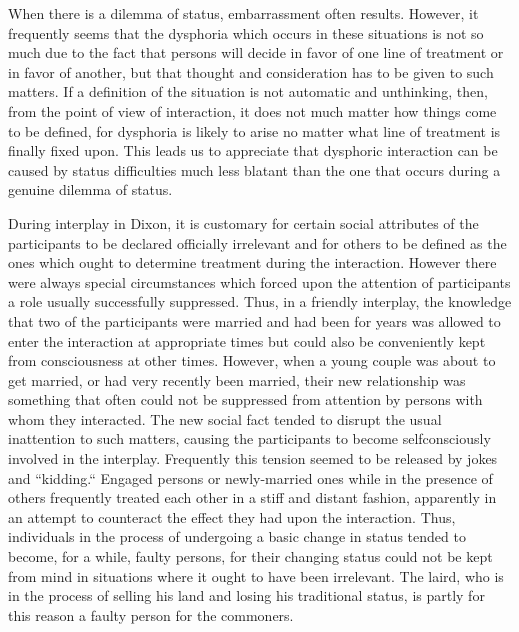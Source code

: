 \documentclass[openany,nobib]{tufte-book}
\begin{document}
When there is a dilemma of status, embarrassment often results. However,
it frequently seems that the dysphoria which occurs in these situations
is not so much due to the fact that persons will decide in favor of one
line of treatment or in favor of another, but that thought and
consideration has to be given to such matters. If a definition of the
situation is not automatic and unthinking, then, from the point of view
of interaction, it does not much matter how things come to be defined,
for dysphoria is likely to arise no matter what line of treatment is
finally fixed upon. This leads us to appreciate that dysphoric
interaction can be caused by status difficulties much less blatant than
the one that occurs during a genuine dilemma of status.

During interplay in Dixon, it is customary for certain social attributes
of the participants to be declared officially irrelevant and for others
to be defined as the ones which ought to determine treatment during the
interaction. However there were always special circumstances which
forced upon the attention of participants a role usually successfully
suppressed. Thus, in a friendly interplay, the knowledge that two of the
participants were married and had been for years was allowed to enter
the interaction at appropriate times but could also be conveniently kept
from consciousness at other times. However, when a young couple was
about to get married, or had very recently been married, their new
relationship was something that often could not be suppressed from
attention by persons with whom they interacted. The new social fact
tended to disrupt the usual inattention to such matters, causing the
participants to become selfconsciously involved in the interplay.
Frequently this tension seemed to be released by jokes and ``kidding.``
Engaged persons or newly-married ones while in the presence of others
frequently treated each other in a stiff and distant fashion, apparently
in an attempt to counteract the effect they had upon the interaction.
Thus, individuals in the process of undergoing a basic change in status
tended to become, for a while, faulty persons, for their changing status
could not be kept from mind in situations where it ought to have been
irrelevant. The laird, who is in the process of selling his land and
losing his traditional status, is partly for this reason a faulty person
for the commoners.
\end{document}
